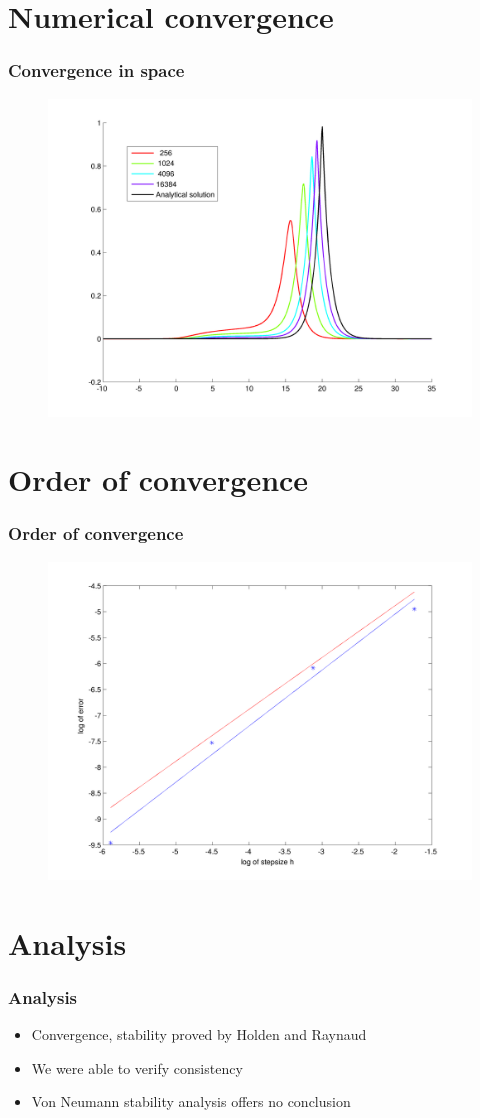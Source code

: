 \documentclass{beamer}
\begin{document}
\section*{Numerical convergence}
\begin{frame}
\frametitle{Convergence in space}
\begin{figure}
\includegraphics[width=0.8\linewidth]{gfx/attimeT}
\end{figure}
\end{frame}

\section*{Order of convergence}
\begin{frame}
\frametitle{Order of convergence}
\begin{figure}
\includegraphics[width=0.8\linewidth]{gfx/loglog}
\end{figure}
\end{frame}

\section*{Analysis}
\begin{frame}
\frametitle{Analysis}
\begin{itemize}
\item Convergence, stability proved by Holden and Raynaud
\item We were able to verify consistency
\item Von Neumann stability analysis offers no conclusion
\end{itemize}
\end{frame}
\end{document}
